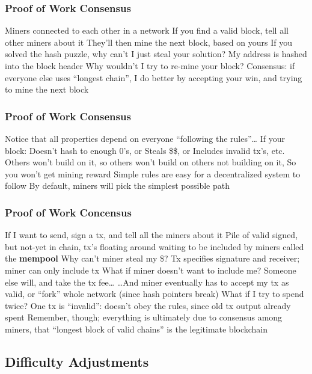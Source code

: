 \documentclass[aspectratio=169]{beamer}
\begin{document}
\begin{frame}
\frametitle{Proof of Work Consensus}

\bi
\m Miners connected to each other in a network
\m If you find a valid block, tell all other miners about it
\bi
\m They'll then mine the next block, based on yours
\ei
\m If you solved the hash puzzle, why can't I just steal your solution? \pause
\bi
\m My address is hashed into the block header 
\ei\pause
\m Why wouldn't I try to re-mine your block? \pause
\bi
\m Consensus: if everyone else uses ``longest chain'', I do better by accepting your win, and trying to mine the next block
\ei
\ei

\end{frame}

\begin{frame}
\frametitle{Proof of Work Consensus}

\bi
\m Notice that all properties depend on everyone ``following the rules''\ldots
\bi
\m If your block:
\bi
\m Doesn't hash to enough 0's, or
\m Steals \$\$, or
\m Includes invalid tx's, etc.
\ei
\m Others won't build on it, so others won't build on others not building on it, 
\m So you won't get mining reward
\ei
\m Simple rules are easy for a decentralized system to follow 
\bi
\m By default, miners will pick the simplest possible path
\ei
\ei

\end{frame}

\begin{frame}
\frametitle{Proof of Work Concensus}

\bi
\m If I want to send, sign a tx, and tell all the miners about it \pause
\bi
\m Pile of valid signed, but not-yet in chain, tx's floating around waiting to be included by miners called the \textbf{mempool}
\ei \pause
\m Why can't miner steal my \$? \pause
\bi
\m Tx specifies signature and receiver; miner can only include tx
\ei
\m What if miner doesn't want to include me? \pause
\bi
\m Someone else will, and take the tx fee\ldots
\m \ldots And miner eventually has to accept my tx as valid, or ``fork'' whole network (since hash pointers break)
\ei \pause
\m What if I try to spend twice? \pause
\bi
\m One tx is ``invalid'': doesn't obey the rules, since old tx output already spent
\m Remember, though; everything is ultimately due to consensus among miners, that ``longest block of valid chains'' is the legitimate blockchain
\ei
\ei

\end{frame}


\subsection{Difficulty Adjustments}
\end{document}
